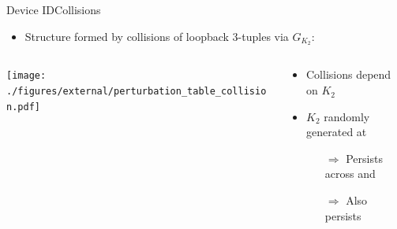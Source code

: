 \documentclass[aspectratio=169, hyperref={colorlinks=true, allcolors=SecondaryColor}, c]{beamer}
\begin{document}
	\begin{frame}[fragile]{Device ID}{Collisions}
		\begin{itemize}
			\item Structure formed by \alert{collisions of loopback 3-tuples} via $G_{K_2}$:
		\end{itemize}
		\begin{columns}
			\begin{column}{0.6\textwidth}
				\vspace{0.5cm}
				\texttt{[image: ./figures/external/perturbation\_table\_collision.pdf]} %
			\end{column}
			\begin{column}{0.4\textwidth}
				\begin{itemize}
					\item Collisions depend on $K_2$
					\item $K_2$ randomly generated at 
					\begin{itemize}
						\item[\alert{$\Rightarrow$}] Persists across  and 
						\item[\alert{$\Rightarrow$}] Also  persists
					\end{itemize}
				\end{itemize}


\end{column}
\end{columns}
\end{frame}
\end{document}
